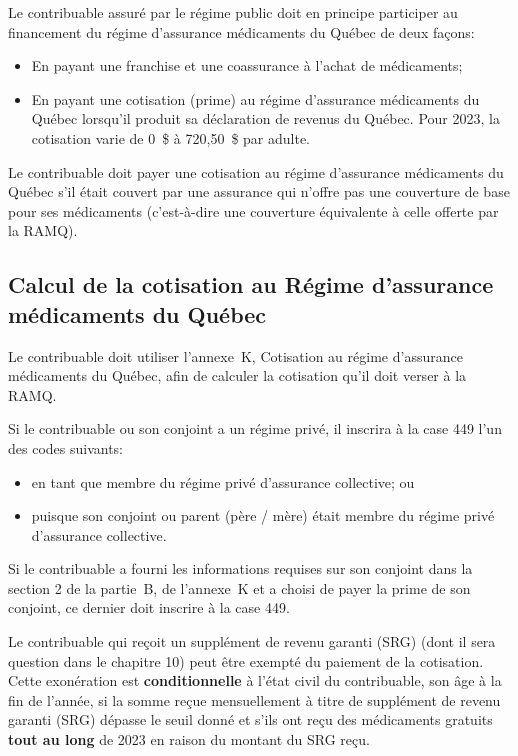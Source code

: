 Le contribuable assuré par le régime public doit en principe participer au financement du régime d'assurance médicaments du Québec de deux façons:
\begin{itemize}
	\item En payant une franchise et une coassurance à l'achat de médicaments;
	\item En payant une cotisation (prime) au régime d'assurance médicaments du Québec lorsqu'il produit sa déclaration de revenus du Québec. Pour 2023, la cotisation varie de 0~\$ à 720,50~\$ par adulte.
\end{itemize}

\begin{note}
	Le contribuable doit payer une cotisation au régime d'assurance médicaments du Québec s'il était couvert par une assurance qui n'offre pas une couverture de base pour ses médicaments (c'est-à-dire une couverture équivalente à celle offerte par la RAMQ).
\end{note}


\subsection{Calcul de la cotisation au Régime d'assurance médicaments du Québec}
Le contribuable doit utiliser l'annexe~K, Cotisation au régime d'assurance médicaments du Québec, afin de calculer la cotisation qu'il doit verser à la RAMQ.

\begin{note}
	Si le contribuable ou son conjoint a un régime privé, il inscrira à la case 449 l'un des codes suivants:
	\begin{itemize}
		\item {} \fg{} en tant que membre du régime privé d'assurance collective; ou
		\item {} \fg{} puisque son conjoint ou parent (père / mère) était membre du régime privé d'assurance collective.
	\end{itemize}
	
	Si le contribuable a fourni les informations requises sur son conjoint dans la section 2 de la partie~B, de l'annexe~K et a choisi de payer la prime de son conjoint, ce dernier doit inscrire  \fg{} à la case 449.
\end{note}

\begin{note}
	Le contribuable qui reçoit un supplément de revenu garanti (SRG) (dont il sera question dans le chapitre 10) peut être exempté du paiement de la cotisation. Cette exonération est \textbf{conditionnelle} à l'état civil du contribuable, son âge à la fin de l'année, si la somme reçue mensuellement à titre de supplément de revenu garanti (SRG) dépasse le seuil donné et s'ils ont reçu des médicaments gratuits \textbf{tout au long} de 2023 en raison du montant du SRG reçu.
\end{note}

